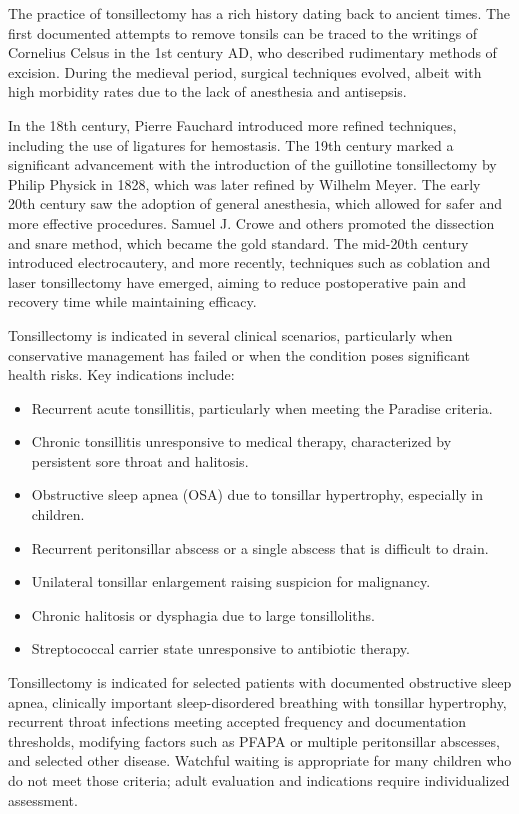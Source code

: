 The practice of tonsillectomy has a rich history dating back to ancient times. The first documented attempts to remove tonsils can be traced to the writings of Cornelius Celsus in the 1st century AD, who described rudimentary methods of excision. During the medieval period, surgical techniques evolved, albeit with high morbidity rates due to the lack of anesthesia and antisepsis.

In the 18th century, Pierre Fauchard introduced more refined techniques, including the use of ligatures for hemostasis. The 19th century marked a significant advancement with the introduction of the guillotine tonsillectomy by Philip Physick in 1828, which was later refined by Wilhelm Meyer. The early 20th century saw the adoption of general anesthesia, which allowed for safer and more effective procedures. Samuel J. Crowe and others promoted the dissection and snare method, which became the gold standard. The mid-20th century introduced electrocautery, and more recently, techniques such as coblation and laser tonsillectomy have emerged, aiming to reduce postoperative pain and recovery time while maintaining efficacy.

Tonsillectomy is indicated in several clinical scenarios, particularly when conservative management has failed or when the condition poses significant health risks. Key indications include:

\begin{itemize}
  \item Recurrent acute tonsillitis, particularly when meeting the Paradise criteria.
  \item Chronic tonsillitis unresponsive to medical therapy, characterized by persistent sore throat and halitosis.
  \item Obstructive sleep apnea (OSA) due to tonsillar hypertrophy, especially in children.
  \item Recurrent peritonsillar abscess or a single abscess that is difficult to drain.
  \item Unilateral tonsillar enlargement raising suspicion for malignancy.
  \item Chronic halitosis or dysphagia due to large tonsilloliths.
  \item Streptococcal carrier state unresponsive to antibiotic therapy.
\end{itemize}

Tonsillectomy is indicated for selected patients with documented obstructive sleep apnea, clinically important sleep-disordered breathing with tonsillar hypertrophy, recurrent throat infections meeting accepted frequency and documentation thresholds, modifying factors such as PFAPA or multiple peritonsillar abscesses, and selected other disease. Watchful waiting is appropriate for many children who do not meet those criteria; adult evaluation and indications require individualized assessment.

